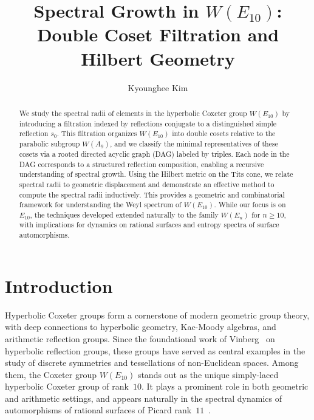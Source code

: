 \documentclass[11pt]{amsart}
\title{Spectral Growth in $W(E_{10})$: \\ Double Coset Filtration and Hilbert Geometry}
\author{Kyounghee Kim}
\numberwithin{equation}{section}
\begin{document}
\maketitle

\begin{abstract}
We study the spectral radii of elements in the hyperbolic Coxeter group $W(E_{10})$ by introducing a filtration indexed by reflections conjugate to a distinguished simple reflection $s_0$. This filtration organizes $W(E_{10})$ into double cosets relative to the parabolic subgroup $W(A_9)$, and we classify the minimal representatives of these cosets via a rooted directed acyclic graph (DAG) labeled by triples. Each node in the DAG corresponds to a structured reflection composition, enabling a recursive understanding of spectral growth. Using the Hilbert metric on the Tits cone, we relate spectral radii to geometric displacement and demonstrate an effective method to compute the spectral radii inductively. This provides a geometric and combinatorial framework for understanding the Weyl spectrum of $W(E_{10})$. While our focus is on $E_{10}$, the techniques developed extended naturally to the family $W(E_n)$ for $n\ge 10$, with implications for dynamics on rational surfaces and entropy spectra of surface automorphisms.
\end{abstract}


\section{Introduction}\label{S:intro}
Hyperbolic Coxeter groups form a cornerstone of modern geometric group theory, with deep connections to hyperbolic geometry, Kac-Moody algebras, and arithmetic reflection groups. Since the foundational work of Vinberg~\cite{Vinberg:1971} on hyperbolic reflection groups, these groups have served as central examples in the study of discrete symmetries and tessellations of non-Euclidean spaces. Among them, the Coxeter group $W(E_{10})$ stands out as the unique simply-laced hyperbolic Coxeter group of rank~$10$. It plays a prominent role in both geometric and arithmetic settings, and appears naturally in the spectral dynamics of automorphisms of rational surfaces of Picard rank~$11$~\cite{McMullen:2002,McMullen:2007,Bedford-Kim:2009,dolgachev2008reflection,Kim:2023}.
\end{document}
